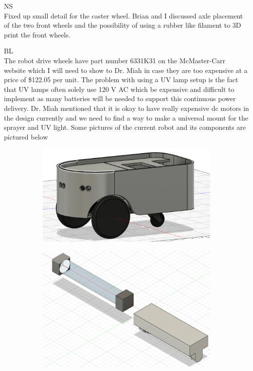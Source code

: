 \documentclass[fontsize=11pt, %
                             paper=a4, %
                             twoside, %
                             captions=tableheading,
                             index=totoc,
                             hyperref]{labbook}
\begin{document}
\begin{addmargin}[0cm]{0cm}
NS\\
Fixed up small detail for the caster wheel. Brian and I discussed axle placement of the two front wheels and the possibility of using a rubber like filament to 3D print the front wheels.

BL\\
The robot drive wheels have part number 6331K31 on the McMaster-Carr website which I will need to show to Dr. Miah in case they are too expensive at a price of \$122.05 per unit. The problem with using a UV lamp setup is the fact that UV lamps often solely use 120 V AC which be expensive and difficult to implement as many batteries will be needed to support this continuous power delivery. Dr. Miah mentioned that it is okay to have really expensive dc motors in the design currently and we need to find a way to make a universal mount for the sprayer and UV light. Some pictures of the current robot and its components are pictured below
\begin{figure}[H]
\begin{subfigure}{.5\textwidth}
\centering
\includegraphics[scale=0.5]{figs/img/v2BodyDesign}
\end{subfigure}
\begin{subfigure}{.5\textwidth}
\centering
\includegraphics[scale=0.3]{figs/img/v2UVLamp}

\end{subfigure}
\end{figure}
\end{addmargin}
\end{document}
